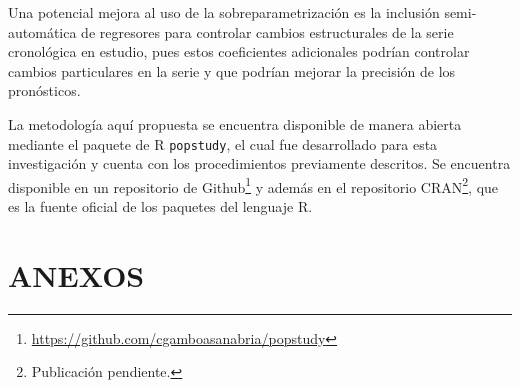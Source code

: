 \documentclass[
]{article}
\begin{document}
Una potencial mejora al uso de la sobreparametrización es la inclusión
semi-automática de regresores para controlar cambios estructurales de la
serie cronológica en estudio, pues estos coeficientes adicionales
podrían controlar cambios particulares en la serie y que podrían mejorar
la precisión de los pronósticos.

La metodología aquí propuesta se encuentra disponible de manera abierta
mediante el paquete de R \texttt{popstudy}, el cual fue desarrollado
para esta investigación y cuenta con los procedimientos previamente
descritos. Se encuentra disponible en un repositorio de
Github\footnote{\url{https://github.com/cgamboasanabria/popstudy}} y
además en el repositorio CRAN\footnote{Publicación pendiente.}, que es
la fuente oficial de los paquetes del lenguaje R.

\newpage

\section{ANEXOS}

\begin{table}[!h]

\caption{\label{tab:unnamed-chunk-50}\label{tab:tiempos_estimacion}Tiempos de estimación en minutos para cada modelo según su tipo de estimación.}
\centering
{}
\end{table}
\end{document}
